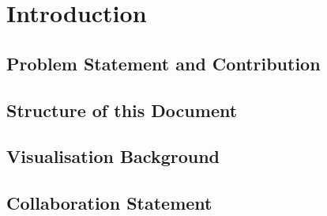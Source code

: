 \section{Introduction}

\subsection{Problem Statement and Contribution}

\subsection{Structure of this Document}

\subsection{Visualisation Background}


\subsection{Collaboration Statement}